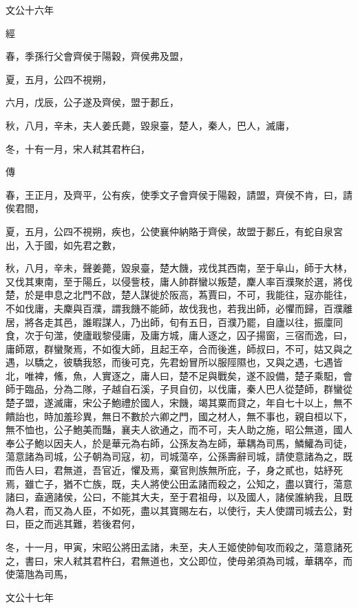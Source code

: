 \documentclass{ctexart}
\begin{document}
文公十六年


經



春，季孫行父會齊侯于陽穀，齊侯弗及盟，

夏，五月，公四不視朔，

六月，戊辰，公子遂及齊侯，盟于郪丘，

秋，八月，辛未，夫人姜氏薨，毀泉臺，楚人，秦人，巴人，滅庸，

冬，十有一月，宋人弒其君杵臼，

傳



春，王正月，及齊平，公有疾，使季文子會齊侯于陽穀，請盟，齊侯不肯，曰，請俟君間，

夏，五月，公四不視朔，疾也，公使襄仲納賂于齊侯，故盟于郪丘，有蛇自泉宮出，入于國，如先君之數，

秋，八月，辛未，聲姜薨，毀泉臺，楚大饑，戎伐其西南，至于阜山，師于大林，又伐其東南，至于陽丘，以侵訾枝，庸人帥群蠻以叛楚，麇人率百濮聚於選，將伐楚，於是申息之北門不啟，楚人謀徙於阪高，蒍賈曰，不可，我能往，寇亦能往，不如伐庸，夫麇與百濮，謂我饑不能師，故伐我也，若我出師，必懼而歸，百濮離居，將各走其邑，誰暇謀人，乃出師，旬有五日，百濮乃罷，自廬以往，振廩同食，次于句澨，使廬戢黎侵庸，及庸方城，庸人逐之，囚子揚窗，三宿而逸，曰，庸師眾，群蠻聚焉，不如復大師，且起王卒，合而後進，師叔曰，不可，姑又與之遇，以驕之，彼驕我怒，而後可克，先君蚡冒所以服陘隰也，又與之遇，七遇皆北，唯裨，鯈，魚，人實逐之，庸人曰，楚不足與戰矣，遂不設備，楚子乘馹，會師于臨品，分為二隊，子越自石溪，子貝自仞，以伐庸，秦人巴人從楚師，群蠻從楚子盟，遂滅庸，宋公子鮑禮於國人，宋饑，竭其粟而貸之，年自七十以上，無不饋詒也，時加羞珍異，無日不數於六卿之門，國之材人，無不事也，親自桓以下，無不恤也，公子鮑美而豔，襄夫人欲通之，而不可，夫人助之施，昭公無道，國人奉公子鮑以因夫人，於是華元為右師，公孫友為左師，華耦為司馬，鱗鱹為司徒，蕩意諸為司城，公子朝為司寇，初，司城蕩卒，公孫壽辭司城，請使意諸為之，既而告人曰，君無道，吾官近，懼及焉，棄官則族無所庇，子，身之貳也，姑紓死焉，雖亡子，猶不亡族，既，夫人將使公田孟諸而殺之，公知之，盡以寶行，蕩意諸曰，盍適諸侯，公曰，不能其大夫，至于君祖母，以及國人，諸侯誰納我，且既為人君，而又為人臣，不如死，盡以其寶賜左右，以使行，夫人使謂司城去公，對曰，臣之而逃其難，若後君何，

冬，十一月，甲寅，宋昭公將田孟諸，未至，夫人王姬使帥甸攻而殺之，蕩意諸死之，書曰，宋人弒其君杵臼，君無道也，文公即位，使母弟須為司城，華耦卒，而使蕩虺為司馬，





文公十七年
\end{document}
